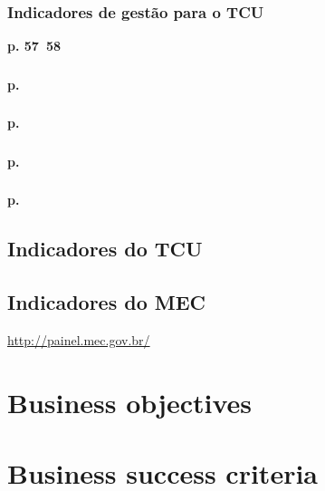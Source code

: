 \documentclass{article}
\begin{document}
\subsubsection*{Indicadores de gestão para o TCU}
\cite{indicadores_TCU}
\todo[inline]{}
\textbf{p. 57~58}


\subsubsection*{}
\textbf{p. }

\subsubsection*{}
\textbf{p. }

\subsubsection*{}
\textbf{p. }

\subsubsection*{}
\textbf{p. }


\subsection*{Indicadores do TCU}
\cite{indicadores_TCU}

\subsection*{Indicadores do MEC}
\url{http://painel.mec.gov.br/}

\section*{Business objectives}

\section*{Business success criteria}

\cite{anuario_2014_base_2013}
\cite{pdi_ufc}



\end{document}
